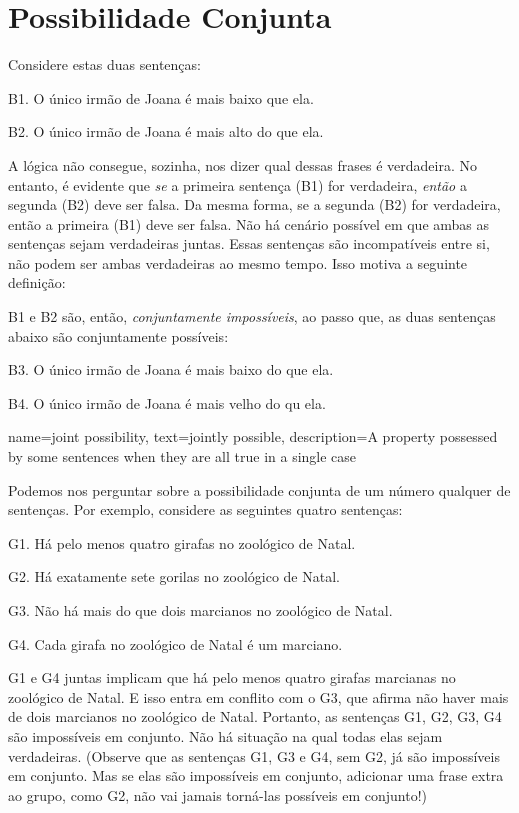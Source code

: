 \section{Possibilidade Conjunta}
Considere estas duas sentenças:
	\begin{ebullet}
		\item[B1.] O único irmão de Joana é mais baixo que ela.
		\item[B2.] O único irmão de Joana é mais alto do que ela.
	\end{ebullet}	
A lógica não consegue, sozinha, nos dizer qual dessas frases é verdadeira.
No entanto, é evidente que \emph{se} a primeira sentença (B1) for verdadeira, \emph{então} a segunda (B2) deve ser falsa.
Da mesma forma, se a segunda (B2) for verdadeira, então a primeira (B1) deve ser falsa.
Não há cenário possível em que ambas as sentenças sejam verdadeiras juntas.
Essas sentenças são incompatíveis entre si, não podem ser ambas verdadeiras ao mesmo tempo.
Isso motiva a seguinte definição:

B1 e B2 são, então, \emph{conjuntamente impossíveis}, ao passo que, as duas sentenças abaixo são conjuntamente possíveis:
	\begin{ebullet}
		\item[B3.] O único irmão de Joana é mais baixo do que ela.
		\item[B4.] O único irmão de Joana é mais velho do qu ela.
	\end{ebullet}

{
name=joint possibility,
text={jointly possible},
description={A property possessed by some sentences when they are all true in a single case}
}

Podemos nos perguntar sobre a possibilidade conjunta de um número qualquer de sentenças.
Por exemplo, considere as seguintes quatro sentenças:
	\begin{ebullet}	
		\item[G1.] \label{MartianGiraffes} Há pelo menos quatro girafas no zoológico de Natal.
		\item[G2.] Há exatamente sete gorilas no zoológico de Natal.
		\item[G3.] Não há mais do que dois marcianos no zoológico de Natal.
		\item[G4.] Cada girafa no zoológico de Natal é um marciano.
	\end{ebullet}
G1 e G4 juntas implicam que há pelo menos quatro girafas marcianas no zoológico de Natal.
E isso entra em conflito com o G3, que afirma não haver mais de dois marcianos no zoológico de Natal.
Portanto, as sentenças G1, G2, G3, G4 são impossíveis em conjunto.
Não há situação na qual todas elas sejam verdadeiras. 
(Observe que as sentenças G1, G3 e G4, sem G2, já são impossíveis em conjunto.
Mas se elas são impossíveis em conjunto, adicionar uma frase extra ao grupo, como G2, não vai jamais torná-las possíveis em conjunto!)


